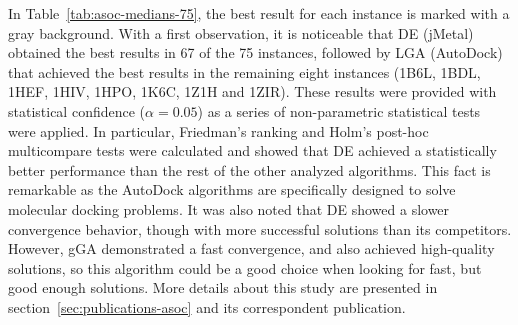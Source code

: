 In Table~\ref{tab:asoc-medians-75}, the best result for each instance is marked with a gray background. With a first observation, it is noticeable that DE (jMetal) obtained the best results in 67 of the 75 instances, followed by LGA (AutoDock) that achieved the best results in the remaining eight instances (1B6L, 1BDL, 1HEF, 1HIV, 1HPO, 1K6C, 1Z1H and 1ZIR). These results were provided with statistical confidence ($\alpha = 0.05$) as a series of non-parametric statistical tests were applied. In particular, Friedman's ranking and Holm's post-hoc multicompare tests were calculated and showed that DE achieved a statistically better performance than the rest of the other analyzed algorithms. This fact is remarkable as the AutoDock algorithms are specifically designed to solve molecular docking problems.
It was also noted that DE showed a slower convergence behavior, though with more successful solutions than its competitors. However, gGA demonstrated a fast convergence, and also achieved high-quality solutions, so this algorithm could be a good choice when looking for fast, but good enough solutions. More details about this study are presented in section~\ref{sec:publications-asoc} and its correspondent publication.

